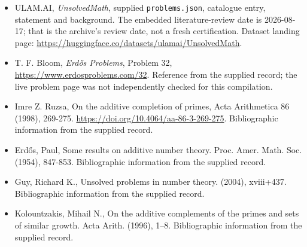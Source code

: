 \documentclass[11pt,a4paper]{article}
\begin{document}
{\small

\begin{itemize}

\item[\hypertarget{source:statement:1}{S1}] ULAM.AI, \emph{UnsolvedMath}, supplied \texttt{problems.json}, catalogue entry, statement and background. The embedded literature-review date is 2026-08-17; that is the archive’s review date, not a fresh certification. Dataset landing page: \url{https://huggingface.co/datasets/ulamai/UnsolvedMath}.

\item[\hypertarget{source:statement:2}{S2}] T. F. Bloom, \emph{Erdős Problems}, Problem 32, \url{https://www.erdosproblems.com/32}. Reference from the supplied record; the live problem page was not independently checked for this compilation.

\item[\hypertarget{source:statement:3}{S3}] Imre Z. Ruzsa, On the additive completion of primes, Acta Arithmetica 86 (1998), 269-275. \url{https://doi.org/10.4064/aa-86-3-269-275}. Bibliographic information from the supplied record.

\item[\hypertarget{source:statement:4}{S4}] Erd\H{o}s, Paul, Some results on additive number theory. Proc. Amer. Math. Soc. (1954), 847-853. Bibliographic information from the supplied record.

\item[\hypertarget{source:statement:5}{S5}] Guy, Richard K., Unsolved problems in number theory. (2004), xviii+437. Bibliographic information from the supplied record.

\item[\hypertarget{source:statement:6}{S6}] Kolountzakis, Mihail N., On the additive complements of the primes and sets of similar growth. Acta Arith. (1996), 1--8. Bibliographic information from the supplied record.

\end{itemize}

}

\label{end:statement}
\end{document}
